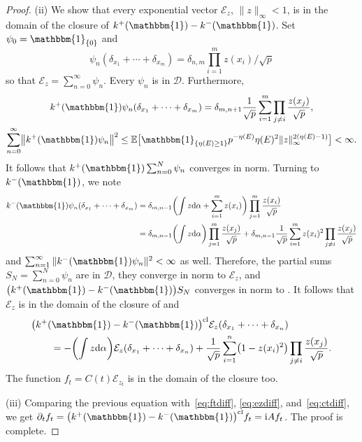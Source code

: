 \documentclass[pdftex]{sigma}
\numberwithin{equation}{section}
\newcommand{\E}{\mathbb{E}}
\newcommand{\dd}{\mathrm{d}} %
\newcommand{\1}{\mathbbm{1}}
\begin{document}
\begin{proof}
(ii) We show that every exponential vector $\mathcal E_z$, $\|z\|_\infty <1$, is in the domain of the closure of $k^+(\1) - k^-(\1)$. Set $\psi_0 = \1_{\{0\}}$ and
\[
\psi_n(\delta_{x_1}+\cdots +\delta_{x_m}) = \delta_{n,m} \prod_{i=1}^m z(x_i)/\sqrt p
\]
 so that $\mathcal E_z = \sum_{n=0}^\infty \psi_n$. Every $\psi_n$ is in $\mathcal D$. Furthermore,
\begin{gather*}
	k^+(\1) \psi_n (\delta_{x_1}+\cdots +\delta_{x_m}) = \delta_{m,n+1}
		\frac 1 {\sqrt p} \sum_{i=1}^m \prod_{j\neq i} \frac{z(x_j)}{\sqrt p},
\\
	\sum_{n=0}^\infty \bigl\|k^+(\1) \psi_n\bigr\|^2 \leq \E\bigl[ \1_{\{\eta(E)\geq 1\}} p^{- \eta(E)} \eta(E)^2 \|z\|_\infty^{2(\eta(E) - 1)}\bigr]< \infty.
\end{gather*}
It follows that $k^+(\1) \sum_{n=0}^N \psi_n$ converges in norm. Turning to $k^-(\1)$, we note
\begin{align*}
	k^-(\1) \psi_n(\delta_{x_1}+\cdots +\delta_{x_m}) &{} = \delta_{m,n-1}\biggl( \int z \dd \alpha+ \sum_{i=1}^m z(x_i)\biggr) \prod_{j=1}^m \frac{z(x_i)}{\sqrt p}\\
	&{} = \delta_{m,n-1} \biggl( \int z \dd\alpha\biggr)\prod_{j=1}^m \frac{z(x_j)}{\sqrt p}
	+ \delta_{m,n-1} \frac{1}{\sqrt p} \sum_{i=1}^m z(x_i)^2 \prod_{j\neq i} \frac{z(x_j)}{\sqrt p}
\end{align*}
and $\sum_{n=1}^\infty \|k^-(\1) \psi_n\|^2 <\infty$ as well. Therefore, the partial sums $S_N = \sum_{n=0}^N \psi_n$ are in $\mathcal D$, they converge in norm to $\mathcal E_z$, and $\bigl(k^+(\1)-k^-(\1)\bigr)S_N$ converges in norm to \smash{$\sum_n \bigl(k^+(\1)-k^-(\1)\bigr)\psi_n$}. It follows that $\mathcal E_z$ is in the domain of the closure of \smash{$\bigl(k^+(\1) - k^-(\1)\bigr)$} and
\begin{align}
&	\bigl(k^+(\1)-k^-(\1)\bigr)^\mathrm{cl} \mathcal E_z(\delta_{x_1}+\cdots + \delta_{x_n})\nonumber\\
& \qquad{}	= - \biggl(\int z \dd \alpha\biggr) \mathcal E_z(\delta_{x_1}+\cdots + \delta_{x_n})
	 + \frac{1}{\sqrt p} \sum_{i=1}^n \bigl( 1- z(x_i)^2\bigr) \prod_{j\neq i} \frac{z(x_j)}{\sqrt p}.\label{eq:kpmft}
\end{align}
The function $f_t = C(t) \mathcal E_{z_t}$ is in the domain of the closure too.

(iii) Comparing the previous equation with~\eqref{eq:ftdiff}, \eqref{eq:ezdiff}, and~\eqref{eq:ctdiff}, we get $\partial_t f_t = \bigl(k^+(\1) - \smash{k^-(\1)\bigr)^\mathrm{cl}} f_t = \mathrm i A f_t$. The proof is complete.
\end{proof}
\end{document}
